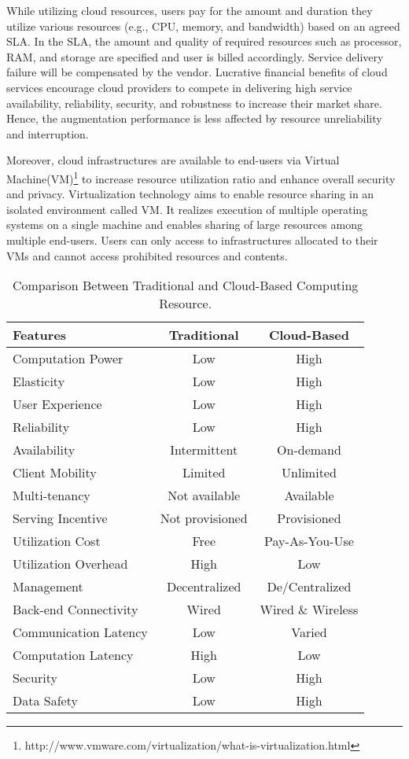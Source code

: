 \documentclass[publish]{IEEEtran}
\begin{document}
While utilizing cloud resources, users pay for the amount and duration they utilize various resources (e.g., CPU, memory, and bandwidth) based on an agreed SLA. In the SLA, the amount and quality of required resources such as processor, RAM, and storage are specified and user is billed accordingly. Service delivery failure will be compensated by the vendor. Lucrative financial benefits of cloud services encourage cloud providers to compete in delivering high service availability, reliability, security, and robustness to increase their market share. Hence, the augmentation performance is less affected by resource unreliability and interruption.

Moreover, cloud infrastructures are available to end-users via Virtual Machine(VM)\footnote{http://www.vmware.com/virtualization/what-is-virtualization.html} to increase resource utilization ratio and enhance overall security and privacy. Virtualization technology aims to enable resource sharing in an isolated environment called VM. It realizes execution of multiple operating systems on a single machine and enables sharing of large resources among multiple end-users. Users can only access to infrastructures allocated to their VMs and cannot access prohibited resources and contents.

 \begin{table*} [!t]
\centering
\caption{Comparison Between Traditional and Cloud-Based Computing Resource.} \label{traditionalVScloudbased}
\begin{tabular}{|l|c|c|} 
\hline
Features & Traditional & Cloud-Based \\ \hline
Computation Power& Low & High \\ \hline
Elasticity & Low & High \\ \hline
User Experience & Low & High \\ \hline
Reliability & Low & High \\ \hline
Availability & Intermittent& On-demand \\ \hline
Client Mobility& Limited & Unlimited \\ \hline
Multi-tenancy & Not available  & Available \\ \hline
Serving Incentive & Not provisioned & Provisioned \\ \hline
Utilization Cost & Free & Pay-As-You-Use \\ \hline
Utilization Overhead & High & Low \\ \hline
Management & Decentralized & De/Centralized \\\hline
Back-end Connectivity & Wired & Wired \& Wireless\\ \hline
Communication Latency & Low & Varied \\ \hline
Computation Latency & High & Low \\ \hline
Security & Low & High \\  \hline
Data Safety & Low & High \\ \hline
\end{tabular}
\end{table*}
\end{document}
